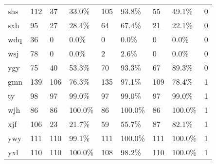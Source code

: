 \begin{landscape}
\begin{longtable}{m{2cm}<{\centering}m{2cm}<{\centering}m{2cm}<{\centering}m{2cm}<{\centering}m{2cm}<{\centering}m{2cm}<{\centering}m{2cm}<{\centering}m{2cm}<{\centering}m{2cm}<{\centering}}
            shs                   & 112                   & 37         & 33.0\%     & 105        & 93.8\%     & 55         & 49.1\%      & 0                                                                      \\
            sxh                   & 95                    & 27         & 28.4\%     & 64         & 67.4\%     & 21         & 22.1\%      & 0                                                                      \\
            wdq                   & 36                    & 0          & 0.0\%      & 0          & 0.0\%      & 0          & 0.0\%       & 0                                                                      \\
            wsj                   & 78                    & 0          & 0.0\%      & 2          & 2.6\%      & 0          & 0.0\%       & 0                                                                      \\
            ygy                   & 75                    & 40         & 53.3\%     & 70         & 93.3\%     & 67         & 89.3\%      & 0                                                                      \\
            gmn                   & 139                   & 106        & 76.3\%     & 135        & 97.1\%     & 109        & 78.4\%      & 1                                                                      \\
            ty                    & 98                    & 97         & 99.0\%     & 97         & 99.0\%     & 97         & 99.0\%      & 1                                                                      \\
            wjh                   & 86                    & 86         & 100.0\%    & 86         & 100.0\%    & 86         & 100.0\%     & 1                                                                      \\
            xjf                   & 106                   & 23         & 21.7\%     & 59         & 55.7\%     & 87         & 82.1\%      & 1                                                                      \\
            ywy                   & 111                   & 110        & 99.1\%     & 111        & 100.0\%    & 111        & 100.0\%     & 1                                                                      \\
            yxl                   & 110                   & 110        & 100.0\%    & 108        & 98.2\%     & 110        & 100.0\%     & 1                                                                      \\

\end{longtable}
\end{landscape}
